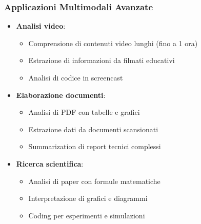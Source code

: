 \documentclass[aspectratio=169]{beamer}
\begin{document}
\begin{frame}
\frametitle{Applicazioni Multimodali Avanzate}
\begin{itemize}
    \item \textbf{Analisi video}:
    \begin{itemize}
        \item Comprensione di contenuti video lunghi (fino a 1 ora)
        \item Estrazione di informazioni da filmati educativi
        \item Analisi di codice in screencast
    \end{itemize}
    \item \textbf{Elaborazione documenti}:
    \begin{itemize}
        \item Analisi di PDF con tabelle e grafici
        \item Estrazione dati da documenti scansionati
        \item Summarization di report tecnici complessi
    \end{itemize}
    \item \textbf{Ricerca scientifica}:
    \begin{itemize}
        \item Analisi di paper con formule matematiche
        \item Interpretazione di grafici e diagrammi
        \item Coding per esperimenti e simulazioni
    \end{itemize}
\end{itemize}
\end{frame}
%
%
\end{document}
